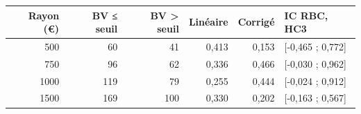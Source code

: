 \begin{tabularx}{\linewidth}{rrrrrX}
\toprule
Rayon (€) & BV ≤ seuil & BV > seuil & Linéaire & Corrigé & IC RBC, HC3 \\
\midrule
500 & 60 & 41 & 0,413 & 0,153 & [-0,465 ; 0,772] \\
750 & 96 & 62 & 0,336 & 0,466 & [-0,030 ; 0,962] \\
1000 & 119 & 79 & 0,255 & 0,444 & [-0,024 ; 0,912] \\
1500 & 169 & 100 & 0,330 & 0,202 & [-0,163 ; 0,567] \\
\bottomrule
\end{tabularx}
